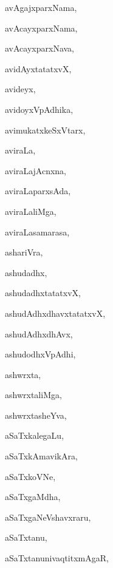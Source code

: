 \begin{multicols}{3}
{\noindent
{avAgajxparxNama}, \pageref{avAgajxparxNama}

\noindent
{avAcayxparxNama}, \pageref{avAcayxparxNama}

\noindent
{avAcayxparxNava}, \pageref{avAcayxparxNava}

\noindent
{avidAyxtatatxvX}, \pageref{avidAyxtatatxvX}

\noindent
{avideyx}, \pageref{avideyx}

\noindent
{avidoyxVpAdhika}, \pageref{avidoyxVpAdhika}

\noindent
{avimukatxkeSxVtarx}, \pageref{avimukatxkeSxVtarx}

\noindent
{aviraLa}, \pageref{aviraLa}

\noindent
{aviraLajAcnxna}, \pageref{aviraLajAcnxna}

\noindent
{aviraLaparxsAda}, \pageref{aviraLaparxsAda}

\noindent
{aviraLaliMga}, \pageref{aviraLaliMga}

\noindent
{aviraLasamarasa}, \pageref{aviraLasamarasa}

\noindent
{ashariVra}, \pageref{ashariVra}

\noindent
{ashudadhx}, \pageref{ashudadhx}

\noindent
{ashudadhxtatatxvX}, \pageref{ashudadhxtatatxvX}

\noindent
{ashudAdhxdhavxtatatxvX}, \pageref{ashudAdhxdhavxtatatxvX}

\noindent
{ashudAdhxdhAvx}, \pageref{ashudAdhxdhAvx}

\noindent
{ashudodhxVpAdhi}, \pageref{ashudodhxVpAdhi}

\noindent
{ashwrxta}, \pageref{ashwrxta}

\noindent
{ashwrxtaliMga}, \pageref{ashwrxtaliMga}

\noindent
{ashwrxtasheYva}, \pageref{ashwrxtasheYva}

\noindent
{aSaTxkalegaLu}, \pageref{aSaTxkalegaLu}

\noindent
{aSaTxkAmavikAra}, \pageref{aSaTxkAmavikAra}

\noindent
{aSaTxkoVNe}, \pageref{aSaTxkoVNe}

\noindent
{aSaTxgaMdha}, \pageref{aSaTxgaMdha}

\noindent
{aSaTxgaNeVshavxraru}, \pageref{aSaTxgaNeVshavxraru}

\noindent
{aSaTxtanu}, \pageref{aSaTxtanu}

\noindent
{aSaTxtanunivaqtitxmAgaR}, \pageref{aSaTxtanunivaqtitxmAgaR}

}
\end{multicols}
